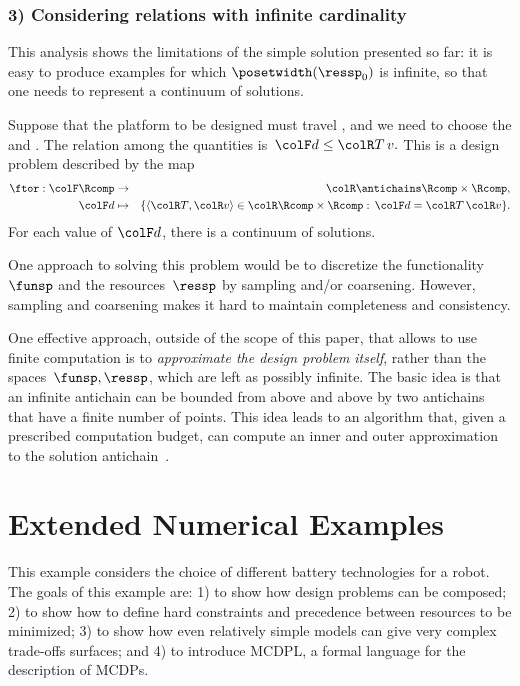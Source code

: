  

\subsubsection*{3) Considering relations with infinite cardinality}

This analysis shows the limitations of the simple solution presented
so far: it is easy to produce examples for which $\posetwidth(\ressp_{0})$
is infinite, so that one needs to represent a continuum of solutions.

\begin{example}
Suppose that the platform to be designed must travel , and we need to choose the 
and . The relation among the quantities
is~${\colF d}\leq{\colR T\,v}.$ This is a design problem described
by the map
\begin{eqnarray*}
\ftor:{\colF\Rcomp} & \rightarrow & {\colR\antichains\Rcomp\times\Rcomp,}\\
{\colF d} & \mapsto & \{\langle{\colR T},{\colR v}\rangle\in{\colR\Rcomp\times\Rcomp}:\,{\colF d}={\colR T}\,{\colR v}\}.
\end{eqnarray*}
For each value of ${\colF d}$, there is a continuum of solutions.
\end{example}
One approach to solving this problem would be to discretize the functionality~$\funsp$
and the resources~$\ressp$ by sampling and/or coarsening. However,
sampling and coarsening makes it hard to maintain completeness and
consistency. 

One effective approach, outside of the scope of this paper, that allows
to use finite computation is to \emph{approximate the design problem}
\emph{itself}, rather than the spaces~$\funsp,\ressp$, which are
left as possibly infinite. The basic idea is that an infinite antichain
can be bounded from above and above by two antichains that have a
finite number of points. This idea leads to an algorithm that, given
a prescribed computation budget, can compute an inner and outer approximation
to the solution antichain~\cite{mcdp_icra_uncertainty_arxiv}.



\section{Extended Numerical Examples\label{sec:Numerical-examples}}

This example considers the choice of different battery technologies
for a robot. The goals of this example are: 1) to show how design
problems can be composed; 2) to show how to define hard constraints
and precedence between resources to be minimized; 3) to show how even
relatively simple models can give very complex trade-offs surfaces;
and 4) to introduce MCDPL, a formal language for the description of
MCDPs.

